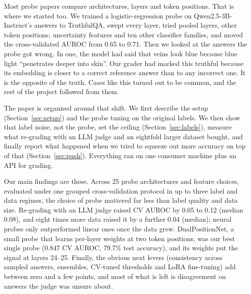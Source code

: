 \documentclass[11pt]{article}
\begin{document}
Most probe papers compare architectures, layers and token positions. That is where we started too. We trained a logistic-regression probe on Qwen2.5-3B-Instruct's answers to TruthfulQA, swept every layer, tried pooled layers, other token positions, uncertainty features and ten other classifier families, and moved the cross-validated AUROC from 0.65 to 0.71. Then we looked at the answers the probe got wrong. In one, the model had said that veins look blue because blue light ``penetrates deeper into skin''. Our grader had marked this truthful because its embedding is closer to a correct reference answer than to any incorrect one. It is the opposite of the truth. Cases like this turned out to be common, and the rest of the project followed from them.

The paper is organised around that shift. We first describe the setup (Section~\ref{sec:setup}) and the probe tuning on the original labels. We then show that label noise, not the probe, set the ceiling (Section~\ref{sec:labels}), measure what re-grading with an LLM judge and an eightfold larger dataset bought, and finally report what happened when we tried to squeeze out more accuracy on top of that (Section~\ref{sec:push}). Everything ran on one consumer machine plus an API for grading.

Our main findings are these. Across 25 probe architectures and feature choices, evaluated under one grouped cross-validation protocol in up to three label and data regimes, the choice of probe mattered far less than label quality and data size. Re-grading with an LLM judge raised CV AUROC by 0.05 to 0.12 (median 0.08), and eight times more data raised it by a further 0.04 (median); neural probes only outperformed linear ones once the data grew. DualPositionNet, a small probe that learns per-layer weights at two token positions, was our best single probe (0.847 CV AUROC, 79.7\% test accuracy), and its weights put the signal at layers 24--25. Finally, the obvious next levers (consistency across sampled answers, ensembles, CV-tuned thresholds and LoRA fine-tuning) add between zero and a few points, and most of what is left is disagreement on answers the judge was unsure about.
\end{document}
